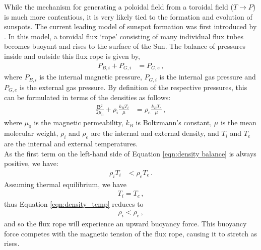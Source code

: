 \documentclass[11pt,a4paper,onecolumn]{report}
\begin{document}
%
While the mechanism for generating a poloidal field from a toroidal field (\(T
\rightarrow P\)) is much more contentious, it is very likely tied to the
formation and evolution of sunspots. The current leading model of sunspot
formation was first introduced by \citet{parker_formation_1955}. In this model,
a toroidal flux `rope' consisting of many individual flux tubes becomes buoyant
and rises to the surface of the Sun. The balance of pressures inside and outside
this flux rope is given by,
\begin{align}
  P_{B,i} + P_{G,i} &= P_{G,e}\,,
\end{align}
where \(P_{B,i}\) is the internal magnetic pressure, \(P_{G,i}\) is the internal
gas pressure and \(P_{G,e}\) is the external gas pressure. By definition of the
respective pressures, this can be formulated in terms of the densities as
follows:
\begin{align}
  \label{eqn:density balance}
  \frac{\bm{B}^2}{2\mu_0} + \rho_i \frac{k_B T_i}{\mu} &= \rho_e \frac{k_B T_e}{\mu}\,,
\end{align}
where \(\mu_0 \) is the magnetic permeability, \(k_B\) is Boltzmann's constant,
\(\mu\) is the mean molecular weight, \(\rho_i\) and \(\rho_e\) are the internal
and external density, and \(T_i\) and \(T_e\) are the internal and external
temperatures.\\

\noindent As the first term on the left-hand side of Equation \ref{eqn:density balance}
is always positive, we have:
\begin{align}
  \label{eqn:density_temp}
  \rho_i T_i &< \rho_e T_e\,.
\end{align}
Assuming thermal equilibrium, we have
\begin{align}
  T_i = T_e \, ,
\end{align}
thus Equation \ref{eqn:density_temp} reduces to
\begin{align}
  \rho_i < \rho_e\,,
\end{align}
and so the flux rope will experience an upward buoyancy force. This
buoyancy force competes with the magnetic tension of the flux rope, causing it to
stretch as rises. \\
\end{document}
